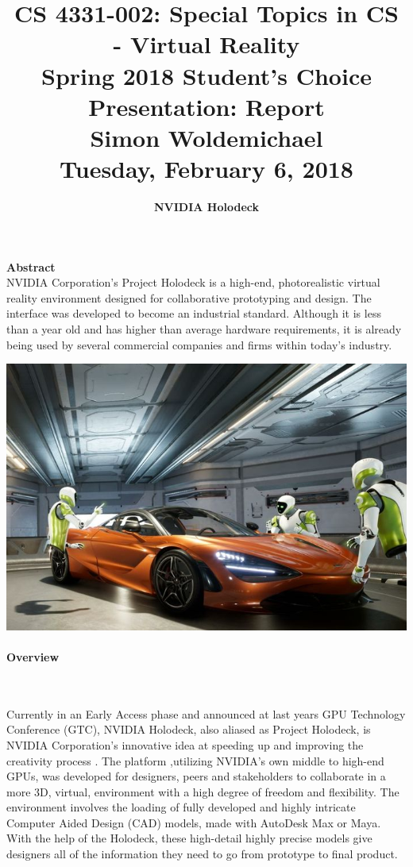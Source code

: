\documentclass[11pt]{article}
\begin{document}
\title{\Large CS 4331-002: Special Topics in CS - Virtual Reality \\ Spring 2018 Student's Choice Presentation: Report \\ \Large Simon Woldemichael \\ Tuesday, February 6, 2018 \\}
\author{\LARGE \textbf{NVIDIA Holodeck}}
\vspace{-2cm}
\date{}

\maketitle
\vspace{-1cm}
\hspace{30pt}

\begin{center}
\textbf{Abstract}\\

NVIDIA Corporation's Project Holodeck is a high-end, photorealistic virtual reality environment designed for collaborative prototyping and design. The interface was developed to become an industrial standard. Although it is less than a year old and has higher than average hardware requirements, it is already being used by several commercial companies and firms within today's industry.
\end{center}
\centerline{
\includegraphics[scale=.4]{../images/Holodeck-web.jpg}}
\paragraph{Overview} ~ \par 
Currently in an Early Access phase and announced at last years GPU Technology Conference (GTC), NVIDIA Holodeck, also aliased as Project Holodeck, is NVIDIA Corporation's innovative idea at speeding up and improving the creativity process \cite{nvidianews}. The platform ,utilizing NVIDIA's own middle to high-end GPUs, was developed for designers, peers and stakeholders to collaborate in a more 3D, virtual, environment \cite{nvidiamain} with a high degree of freedom and flexibility. The environment involves the loading of fully developed and highly intricate Computer Aided Design (CAD) models, made with AutoDesk Max or Maya. With the help of the Holodeck, these high-detail highly precise models give designers all of the information they need to go from prototype to final product.
\end{document}
